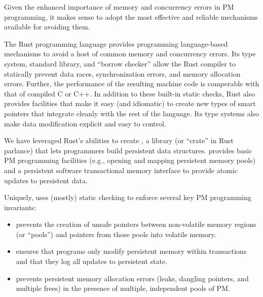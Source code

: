 
Given the enhanced importance of memory and concurrency errors in PM
programming, it makes sense to adopt the most effective and reliable mechanisms
available for avoiding them.

The Rust programming language provides programming language-based mechanisms to
avoid a host of common memory and concurrency errors.  Its type system,
standard library, and ``borrow checker'' allow the Rust compiler to statically
prevent data races, synchronization errors, and memory
allocation errors.  Further, the performance of the resulting machine code is
comperable with that of compiled C or C++.  In addition to these built-in
static checks, Rust also provides facilities that make it easy (and idiomatic)
to create new types of smart pointers that integrate cleanly with the rest of
the language.  Its type systems also make data modification explicit and easy to control.

We have leveraged Rust's abilities to create \this{}, a library (or ``crate''
in Rust parlance) that lets programmers build persistent data structures.
\This{} provides basic PM programming facilities (e.g., opening and mapping
persistent memory pools) and a persistent software transactional memory
interface to provide atomic updates to persistent data.

Uniquely, \this{} uses (mostly) static checking to enforce several key PM
programming invariants:

\begin{itemize}
 
\item \This{} prevents the creation of unsafe pointers between non-volatile memory regions (or ``pools'') and pointers from those pools into volatile memory.
  
\item \This{} ensures that programs only modify persistent memory within transactions and that they log all updates to persistent state.
  
\item \This{} prevents persistent memory allocation errors (leaks, dangling pointers, and multiple frees) in the presence of multiple, independent pools of PM.
  

\end{itemize}

